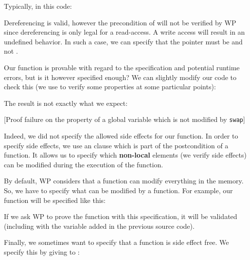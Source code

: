 Typically, in this code:






Dereferencing  is valid, however the precondition of
 will not be verified by WP since dereferencing
 is only legal for a read-access. A write access will
result in an undefined behavior. In such a case, we can specify that the
pointer  must be  and not
.





Our  function is provable with regard to the specification
and potential runtime errors, but is it however specified enough? We can
slightly modify our code to check this (we use  to verify
some properties at some particular points):






The result is not exactly what we expect:



[Proof failure on the property of a global variable which is not
  modified by \texttt{swap}]


Indeed, we did not specify the allowed side effects for our function. In
order to specify side effects, we use an  clause which is
part of the postcondition of a function. It allows us to specify which
\textbf{non-local} elements (we verify side effects) can be modified
during the execution of the function.



By default, WP considers that a function can modify everything in the
memory. So, we have to specify what can be modified by a function. For
example, our  function will be specified like this:






If we ask WP to prove the function with this specification, it will be
validated (including with the variable added in the previous source
code).



Finally, we sometimes want to specify that a function is side effect
free. We specify this by giving  to
:



